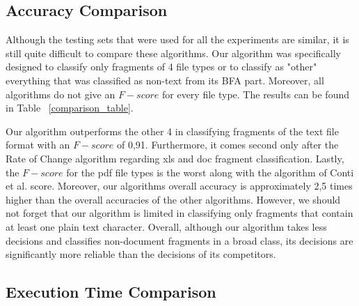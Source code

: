 \subsection{Accuracy Comparison}\label{sub:accuracy}
Although the testing sets that were used for all the experiments are similar, it is still quite difficult to compare these algorithms. Our algorithm was specifically designed to classify only fragments of 4 file types or to classify as "other" everything that was classified as non-text from its BFA part. Moreover, all algorithms do not give an $F-score$ for every file type. The results can be found in Table ~\ref{comparison_table}.

 

Our algorithm outperforms the other 4 in classifying fragments of the text file format with an $F-score$ of 0,91. Furthermore, it comes second only after the Rate of Change algorithm regarding xls and doc fragment classification. Lastly, the $F-score$ for the pdf file types is the worst along with the algorithm of Conti et al. score. Moreover, our algorithms overall accuracy is approximately 2,5 times higher than the overall accuracies of the other algorithms. However, we should not forget that our algorithm is limited in classifying only fragments that contain at least one plain text character. Overall, although our algorithm takes less decisions and classifies non-document fragments in a broad class, its decisions are significantly more reliable than the decisions of its competitors.

\subsection{Execution Time Comparison}\label{sub:speed}




